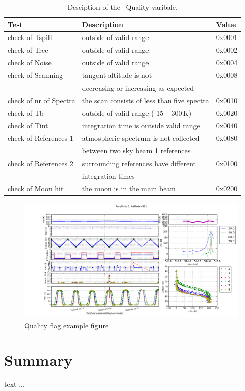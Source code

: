 \begin{table}
\caption{ Desciption of the \smr\ Quality varibale. }
\label{table:quality}
\begin{tabular}{|l|l|l|}
  \hline
  \textbf{Test} & \textbf{Description} & \textbf{Value} \\
  \hline
  check of Tspill   & outside of valid range  & 0x0001 \\
  \hline
  check of Trec     & outside of valid range & 0x0002  \\
  \hline
  check of Noise    & outside of valid range & 0x0004  \\
  \hline
  check of Scanning & tangent altitude is not & 0x0008 \\
                    &  decreasing or increasing as expected &  \\
  \hline
  check of nr of Spectra &  the scan consists of less than five spectra & 0x0010\\
  \hline
  check of Tb       & outside of valid range (-15 -- 300\,K) & 0x0020\\ 
  \hline
  check of Tint     & integration time is outside valid range & 0x0040\\
  \hline
  check of References 1 & atmospheric spectrum is not collected & 0x0080\\
                        & between two sky beam 1 references     & \\
  \hline
  check of References 2 & surrounding references have different & 0x0100\\
                        & integration times                     & \\ 
  \hline check of Moon hit   & the moon is in the main beam          & 0x0200 \\

\hline
\end{tabular}
\end{table}


\begin{figure}[t]
\includegraphics[width=14cm]{quality_control.png}
\caption{Quality flag example figure}
\label{fig:quality}
\end{figure}

    




\chapter{Summary}

text ...


